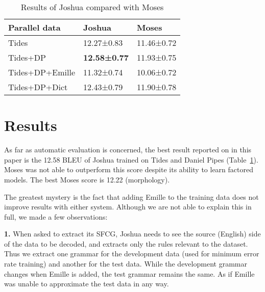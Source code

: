 \documentclass[11pt]{article}
\def\Tref#1{Table~\ref{#1}}
\begin{document}
\begin{table}[ht]
\begin{centering}
\begin{tabular}{l|l|l}
\textbf{Parallel data} & \textbf{Joshua} & \textbf{Moses} \\
\hline
Tides & 12.27±0.83 & 11.46±0.72\\
Tides+DP & \textbf{12.58±0.77} & 11.93±0.75\\
Tides+DP+Emille & 11.32±0.74 & 10.06±0.72\\
Tides+DP+Dict & 12.43±0.79 & 11.90±0.78\\
\end{tabular}
\caption{Results of Joshua compared with Moses}
\label{tab:joshua}
\end{centering}
\end{table}



\section{Results}
\label{results}

As far as automatic evaluation is concerned, the best result reported on in
this paper is the 12.58 BLEU of Joshua trained on Tides and Daniel Pipes
(\Tref{tab:joshua}). Moses was not able to outperform this score despite
its ability to learn factored models. The best Moses score is 12.22 (morphology).

The greatest mystery is the fact that adding Emille to the training data
does not improve results with either system.
Although we are not able to explain this in full, we made a few observations:

{\bf 1.}
When asked to extract its SFCG, Joshua needs to see the source
        (English) side of the data to be decoded, and extracts only the rules
        relevant to the dataset. Thus we extract one grammar for the
        development data (used for minimum error rate training) and another
        for the test data. While the development grammar changes when Emille
        is added, the test grammar remains the same. As if Emille was unable
        to approximate the test data in any way.
\end{document}
